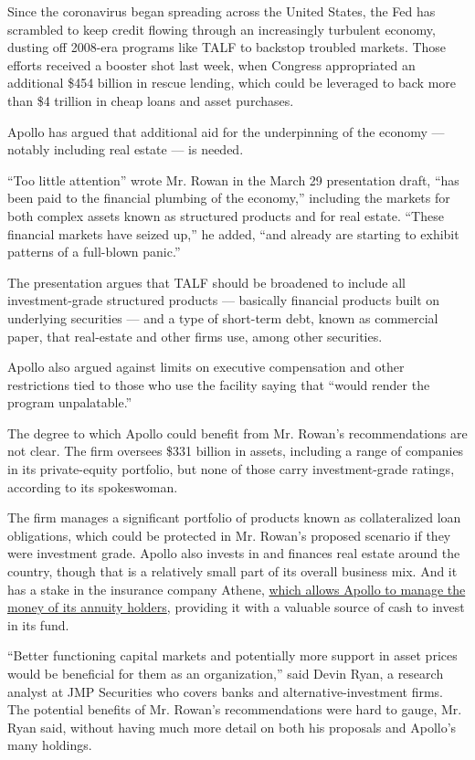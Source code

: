 Since the coronavirus began spreading across the United States, the Fed
has scrambled to keep credit flowing through an increasingly turbulent
economy, dusting off 2008-era programs like TALF to backstop troubled
markets. Those efforts received a booster shot last week, when Congress
appropriated an additional \$454 billion in rescue lending, which could
be leveraged to back more than \$4 trillion in cheap loans and asset
purchases.

Apollo has argued that additional aid for the underpinning of the
economy --- notably including real estate --- is needed.

``Too little attention'' wrote Mr. Rowan in the March 29 presentation
draft, ``has been paid to the financial plumbing of the economy,''
including the markets for both complex assets known as structured
products and for real estate. ``These financial markets have seized
up,'' he added, ``and already are starting to exhibit patterns of a
full-blown panic.''

The presentation argues that TALF should be broadened to include all
investment-grade structured products --- basically financial products
built on underlying securities --- and a type of short-term debt, known
as commercial paper, that real-estate and other firms use, among other
securities.

Apollo also argued against limits on executive compensation and other
restrictions tied to those who use the facility saying that ``would
render the program unpalatable.''

The degree to which Apollo could benefit from Mr. Rowan's
recommendations are not clear. The firm oversees \$331 billion in
assets, including a range of companies in its private-equity portfolio,
but none of those carry investment-grade ratings, according to its
spokeswoman.

The firm manages a significant portfolio of products known as
collateralized loan obligations, which could be protected in Mr. Rowan's
proposed scenario if they were investment grade. Apollo also invests in
and finances real estate around the country, though that is a relatively
small part of its overall business mix. And it has a stake in the
insurance company Athene,
\href{https://www.bloomberg.com/news/articles/2019-10-28/apollo-global-management-to-buy-an-18-stake-in-athene-holdings}{which
allows Apollo to manage the money of its annuity holders}, providing it
with a valuable source of cash to invest in its fund.

``Better functioning capital markets and potentially more support in
asset prices would be beneficial for them as an organization,'' said
Devin Ryan, a research analyst at JMP Securities who covers banks and
alternative-investment firms. The potential benefits of Mr. Rowan's
recommendations were hard to gauge, Mr. Ryan said, without having much
more detail on both his proposals and Apollo's many holdings.

